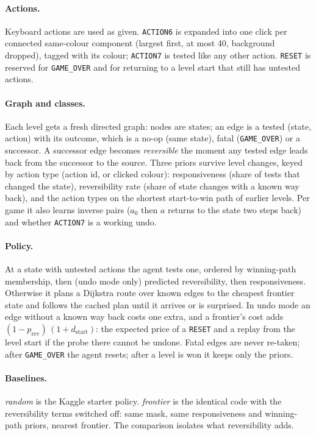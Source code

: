 \documentclass[10pt]{article}
\begin{document}
\paragraph{Actions.} Keyboard actions are used as given. \texttt{ACTION6} is expanded into one click per connected same-colour component (largest first, at most 40, background dropped), tagged with its colour; \texttt{ACTION7} is tested like any other action. \texttt{RESET} is reserved for \texttt{GAME\_OVER} and for returning to a level start that still has untested actions.

\paragraph{Graph and classes.} Each level gets a fresh directed graph: nodes are states; an edge is a tested (state, action) with its outcome, which is a no-op (same state), fatal (\texttt{GAME\_OVER}) or a successor. A successor edge becomes \emph{reversible} the moment any tested edge leads back from the successor to the source. Three priors survive level changes, keyed by action type (action id, or clicked colour): responsiveness (share of tests that changed the state), reversibility rate (share of state changes with a known way back), and the action types on the shortest start-to-win path of earlier levels. Per game it also learns inverse pairs ($a_0$ then $a$ returns to the state two steps back) and whether \texttt{ACTION7} is a working undo.

\paragraph{Policy.} At a state with untested actions the agent tests one, ordered by winning-path membership, then (undo mode only) predicted reversibility, then responsiveness. Otherwise it plans a Dijkstra route over known edges to the cheapest frontier state and follows the cached plan until it arrives or is surprised. In undo mode an edge without a known way back costs one extra, and a frontier's cost adds $(1-p_{\mathrm{rev}})\,(1+d_{\mathrm{start}})$: the expected price of a \texttt{RESET} and a replay from the level start if the probe there cannot be undone. Fatal edges are never re-taken; after \texttt{GAME\_OVER} the agent resets; after a level is won it keeps only the priors.

\paragraph{Baselines.} \emph{random} is the Kaggle starter policy. \emph{frontier} is the identical code with the reversibility terms switched off: same mask, same responsiveness and winning-path priors, nearest frontier. The comparison isolates what reversibility adds.
\end{document}
